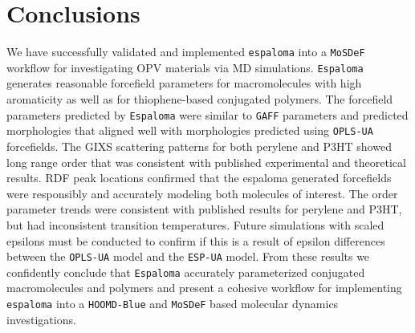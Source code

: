 \section{Conclusions}
\par We have successfully validated and implemented \texttt{espaloma} into a \texttt{MoSDeF} workflow for investigating OPV materials via MD simulations. \texttt{Espaloma} generates reasonable forcefield parameters for macromolecules with high aromaticity as well as for thiophene-based conjugated polymers. The forcefield parameters predicted by \texttt{Espaloma} were similar to \texttt{GAFF} parameters and predicted morphologies that aligned well with morphologies predicted using \texttt{OPLS-UA} forcefields. The GIXS scattering patterns for both perylene and P3HT showed long range order that was consistent with published experimental and theoretical results. RDF peak locations confirmed that the espaloma generated forcefields were responsibly and accurately modeling both molecules of interest. The order parameter trends were consistent with published results for perylene and P3HT, but had inconsistent transition temperatures. Future simulations with scaled epsilons must be conducted to confirm if this is a result of epsilon differences between the \texttt{OPLS-UA} model and the \texttt{ESP-UA} model. From these results we confidently conclude that \texttt{Espaloma} accurately parameterized conjugated macromolecules and polymers and present a cohesive workflow for implementing \texttt{espaloma} into a \texttt{HOOMD-Blue} and \texttt{MoSDeF} based molecular dynamics investigations. 